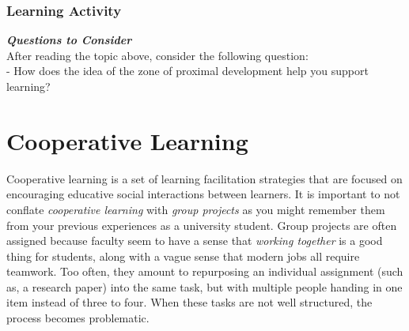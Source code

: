 \documentclass[
]{book}
\begin{document}
\begin{reflect}
\hypertarget{learning-activity-2}{%
\subsubsection*{Learning Activity}\label{learning-activity-2}}

\textbf{\emph{Questions to Consider}}\\
After reading the topic above, consider the following question:\\
- How does the idea of the zone of proximal development help you support learning?
\end{reflect}

\hypertarget{cooperative-learning}{%
\section{Cooperative Learning}\label{cooperative-learning}}

Cooperative learning is a set of learning facilitation strategies that are focused on encouraging educative social interactions between learners. It is important to not conflate \emph{cooperative learning} with \emph{group projects} as you might remember them from your previous experiences as a university student. Group projects are often assigned because faculty seem to have a sense that \emph{working together} is a good thing for students, along with a vague sense that modern jobs all require teamwork. Too often, they amount to repurposing an individual assignment (such as, a research paper) into the same task, but with multiple people handing in one item instead of three to four. When these tasks are not well structured, the process becomes problematic.
\end{document}
